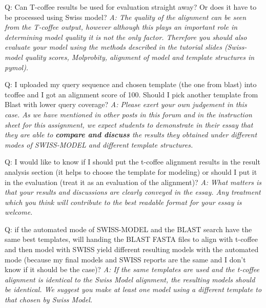 \documentclass[10pt,a4paper]{article}
\begin{document}
Q: Can T-coffee results be used for evaluation straight away? Or does it have to be processed using Swiss model? \newline
\textit{A: The quality of the alignment can be seen from the T-coffee output, however although this plays an important role in determining model quality it is not the only factor. Therefore you should also evaluate your model using the methods described in the tutorial slides (Swiss-model quality scores, Molprobity, alignment of model and template structures in pymol).} \newline


Q: I uploaded my query sequence and chosen template (the one from blast) into tcoffee and I got an alignment score of 100. Should I pick another template from Blast with lower query coverage? \newline
\textit{A: Please exert your own judgement in this case. As we have mentioned in other posts in this forum and in the instruction sheet for this assignment, we  expect students to demonstrate in their essay that they are able to \textbf{compare and discuss} the results they obtained under different modes of SWISS-MODEL and different template structures.} \newline


Q: I would like to know if I should put the t-coffee alignment results in the result analysis section (it helps to choose the template for modeling) or should I put it in the evaluation (treat it as an evaluation of the alignment)?  \newline
\textit{A: What matters is that your results and discussions are clearly conveyed in the essay. Any treatment which you think will contribute to the best readable format for your essay is welcome. } \newline

Q: if the automated mode of SWISS-MODEL and the BLAST search have the same best templates, will handing the BLAST FASTA files to align with t-coffee and then model with SWISS yield different resulting models with the automated mode (because my final models and SWISS reports are the same and I don’t know if it should be the case)? \newline
\textit{A: If the same templates are used and the t-coffee alignment is identical to the Swiss Model alignment, the resulting models should be identical. We suggest you make at least one model using a different template to that chosen by Swiss Model.} \newline
\end{document}
